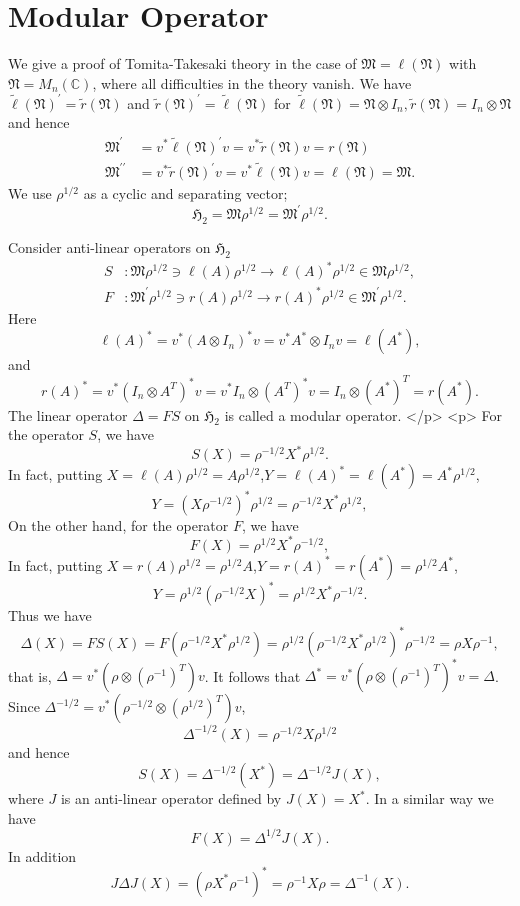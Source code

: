 \section{Modular Operator}
We give a proof  of Tomita-Takesaki theory in the case of 
$\mathfrak{M}=\ell(\mathfrak{N})$ with $\mathfrak{N}=M_n(\mathbb{C})$,
where all difficulties in the theory vanish.
We have 
$\tilde{\ell}(\mathfrak{N})^\prime=\tilde{r}(\mathfrak{N})$ and $\tilde{r}(\mathfrak{N})^\prime=\tilde{\ell}(\mathfrak{N})$ for 
$
\tilde{\ell}(\mathfrak{N})=\mathfrak{N}\otimes I_n,\tilde{r}(\mathfrak{N})=I_n\otimes \mathfrak{N}
$
and hence 
\begin{equation}
\begin{split}
\mathfrak{M}^\prime&=v^\ast \tilde{\ell}(\mathfrak{N})^\prime v= v^\ast \tilde{r}(\mathfrak{N})v=r(\mathfrak{N}) \\
\mathfrak{M}^{\prime\prime}&=v^\ast \tilde{r}(\mathfrak{N})^\prime v= v^\ast \tilde{\ell}(\mathfrak{N})v=\ell(\mathfrak{N})=\mathfrak{M}.
\end{split}
\end{equation}
We use $\rho^{1/2}$ as a cyclic and separating vector;
$$
\mathfrak{H}_2=\mathfrak{M}\rho^{1/2}=\mathfrak{M}^\prime \rho^{1/2}.
$$

 Consider  anti-linear operators on $\mathfrak{H}_2$ 
\begin{equation}\label{SF}
	 \begin{split}
		 S&:\mathfrak{M}\rho^{1/2}\ni \ell(A) \rho^{1/2} \to \ell(A)^\ast\rho^{1/2}\in\mathfrak{M}\rho^{1/2},\\
		 F&:\mathfrak{M}^\prime \rho^{1/2}\ni r(A) \rho^{1/2} \to r(A)^\ast\rho^{1/2}\in \mathfrak{M}^\prime \rho^{1/2}.
	 \end{split}
\end{equation}
	Here 
	$$
	\ell(A)^\ast=v^\ast(A\otimes I_n)^\ast v=v^\ast A^\ast \otimes I_n v=\ell(A^\ast),
	$$
	and
	$$
  r(A)^\ast=v^\ast (I_n\otimes A^T)^\ast v=v^\ast I_n\otimes (A^T)^\ast v=I_n\otimes (A^\ast)^T=r(A^\ast).
	$$
	The linear operator $\Delta=FS$ on $\mathfrak{H}_2$ is called a modular operator.
</p>
<p>
For the operator $S$, we have 
	$$
    S(X)=\rho^{-1/2}X^*\rho^{1/2}.
 	$$
	In fact, putting $X=\ell(A)\rho^{1/2}=A\rho^{1/2}$,$Y=\ell(A)^\ast=\ell(A^\ast)=A^\ast \rho^{1/2}$,
	$$
    Y=(X\rho^{-1/2})^\ast \rho^{1/2}=\rho^{-1/2}X^\ast\rho^{1/2},
  $$
On the other hand, for the operator $F$, we have
$$
F(X)=\rho^{1/2}X^\ast \rho^{-1/2},
$$
In fact, putting $X=r(A)\rho^{1/2}=\rho^{1/2}A$,$Y=r(A)^\ast=r(A^\ast)= \rho^{1/2}A^\ast$,
	$$
    Y= \rho^{1/2}(\rho^{-1/2}X)^\ast=\rho^{1/2}X^\ast\rho^{-1/2}.
  $$
Thus we have
$$
\Delta(X)=FS(X)=F(\rho^{-1/2}X^*\rho^{1/2})=\rho^{1/2}(\rho^{-1/2}X^*\rho^{1/2})^\ast \rho^{-1/2}=\rho X \rho^{-1},
$$
that is, $\Delta=v^\ast(\rho \otimes ({\rho}^{-1})^T) v$.
It follows that $\Delta^\ast=v^\ast (\rho\otimes({\rho}^{-1})^T)^\ast v=\Delta$.
Since $\Delta^{-1/2}=v^\ast(\rho^{-1/2}\otimes ({\rho}^{1/2})^T) v$, 
$$
\Delta^{-1/2}(X)=\rho^{-1/2}X\rho^{1/2}
$$
and hence 
$$
S(X)=\Delta^{-1/2}(X^\ast)=\Delta^{-1/2}J(X),
$$
where $J$ is an anti-linear operator defined by $J(X)=X^\ast$.
In a similar way we have
$$
F(X)=\Delta^{1/2}J(X).
$$
In addition 
$$
J\Delta J(X)=(\rho X^\ast \rho^{-1})^\ast=\rho^{-1}X\rho=\Delta^{-1}(X).
$$


